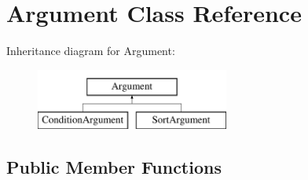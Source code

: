 \hypertarget{classArgument}{\section{Argument Class Reference}
\label{classArgument}
}
Inheritance diagram for Argument\-:\begin{figure}[H]
\begin{center}
\leavevmode
\includegraphics[height=2.000000cm]{classArgument}
\end{center}
\end{figure}
\subsection*{Public Member Functions}
